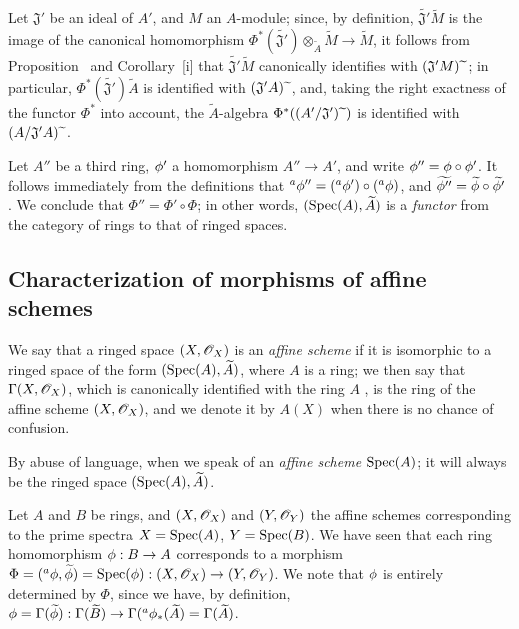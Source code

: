 \begin{env}[1.6.9]
\label{I.1.6.9}
Let $\mathfrak{J}'$ be an ideal of $A'$, and $M$ an $A$-module;
since, by definition, $\widetilde{\mathfrak{J}'}\widetilde{M}$ is the image of the canonical homomorphism $\Phi^*(\widetilde{\mathfrak{J}'})\otimes_{\widetilde{A}}\widetilde{M}\to\widetilde{M}$, it
follows from Proposition~ and Corollary~[i] that
$\widetilde{\mathfrak{J}'}\widetilde{M}$ canonically identifies with $(\mathfrak{J}' M){\,\widetilde{\,}\,}$;
in particular, $\Phi^*(\widetilde{\mathfrak{J}'})\widetilde{A}$ is identified with $(\mathfrak{J}' A){\,\widetilde{\,}\,}$, and, taking the right exactness of the functor $\Phi^*$ into account,
the $\widetilde{A}$-algebra $\Phi^*((A'/\mathfrak{J}'){\,\widetilde{\,}\,})$ is identified with $(A/\mathfrak{J}' A){\,\widetilde{\,}\,}$.
\end{env}

\begin{env}[1.6.10]
\label{I.1.6.10}
Let $A''$ be a third ring, $\phi'$ a homomorphism $A''\to A'$, and write $\phi''=\phi\circ\phi'$.
It follows immediately from the definitions that ${}^a\phi''=({}^a\phi')\circ({}^a\phi)$, and $\widetilde{\phi''}=\widetilde{\phi}\circ\widetilde{\phi'}$ . We conclude that $\Phi''=\Phi'\circ\Phi$;
in other words, $(\operatorname{Spec}(A),\widetilde{A})$ is a \emph{functor} from the category of rings to that of ringed spaces.
\end{env}

\subsection{Characterization of morphisms of affine schemes}
\label{subsection:I.1.7}

\begin{definition}[1.7.1]
\label{I.1.7.1}
We say that a ringed space $(X,\mathscr{O}_X)$ is an \emph{affine scheme} if it is isomorphic to a ringed space of the form $(\operatorname{Spec}(A),\widetilde{A})$, where $A$ is a ring;
we then say that $\Gamma(X,\mathscr{O}_X)$, which is canonically identified with the ring $A$ , is the ring of the affine scheme $(X,\mathscr{O}_X)$, and we denote it by $A(X)$ when there is no chance of confusion.
\end{definition}

By abuse of language, when we speak of an \emph{affine scheme $\operatorname{Spec}(A)$}; it will always be the ringed space $(\operatorname{Spec}(A),\widetilde{A})$.
\begin{env}[1.7.2]
\label{I.1.7.2}
Let $A$ and $B$ be rings, and $(X,\mathscr{O}_X)$ and $(Y,\mathscr{O}_Y)$ the affine schemes corresponding to the prime spectra $X=\operatorname{Spec}(A)$, $Y=\operatorname{Spec}(B)$.
We have seen  that each ring homomorphism $\vphi:B\to A$ corresponds to a morphism $\Phi=({}^a\vphi,\widetilde{\vphi})=\Spec(\vphi):(X,\sh{O}_X)\to(Y,\sh{O}_Y)$.
We note that $\phi$ is entirely determined by $\Phi$, since we have, by definition, $\vphi=\Gamma(\widetilde{\vphi}):\Gamma(\widetilde{B})\to\Gamma({}^a\vphi_*(\widetilde{A})=\Gamma(\widetilde{A})$.
\end{env}

